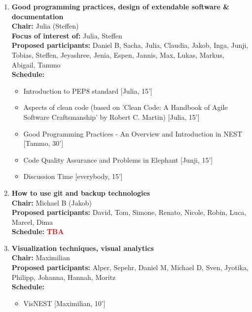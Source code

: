 \documentclass[10pt, a4paper,twoside,american]{article}
\newcommand{\alert}[1]{\textcolor{red}{\bf #1}}
\begin{document}
\begin{enumerate}[resume]
\item {\large\bf Good programming practices, design of extendable software \& documentation}\\[1ex]
  {\bf Chair:} Julia (Steffen)\\[1ex]
  {\bf Focus of interest of:} Julia, Steffen\\[1ex]
  {\bf Proposed participants:} Daniel B, Sacha, Julia, Claudia, Jakob, Inga, Junji, Tobias, Steffen, Jeyashree, Jenia, Espen, Jannis, Max, Lukas, Markus, Abigail, Tammo\\[1ex]
  {\bf Schedule:}
  \begin{itemize}
  \item Introduction to PEP8 standard [Julia, 15']
  \item Aspects of clean code (based on 'Clean Code: A Handbook of Agile Software Craftsmanship' by Robert C. Martin) [Julia, 15']
  \item Good Programming Practices - An Overview and Introduction in NEST [Tammo, 30']
  \item Code Quality Assurance and Problems in Elephant [Junji, 15']
  \item Discussion Time [everybody, 15']
  \end{itemize}
\item {\large\bf How to use git and backup technologies}\\[1ex]
  {\bf Chair:} Michael B (Jakob)\\[1ex]
  {\bf Proposed participants:} David, Tom, Simone, Renato, Nicole, Robin, Luca, Marcel, Dima\\[1ex]
  {\bf Schedule:} \alert{TBA}
\item {\large\bf Visualization techniques, visual analytics}\\[1ex]
  {\bf Chair:} Maximilian \\[1ex]
  {\bf Proposed participants:} Alper, Sepehr, Daniel M, Michael D, Sven, Jyotika, Philipp, Johanna, Hannah, Moritz\\[1ex]
  {\bf Schedule:} 
  \begin{itemize}
  \item VisNEST [Maximilian, 10']

\end{itemize}
\end{enumerate}
\end{document}
